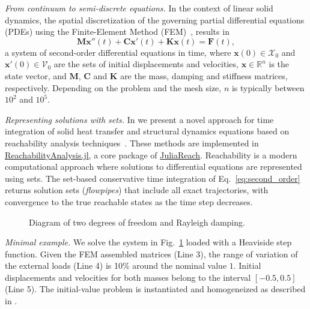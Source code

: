 \documentclass{juliacon}
\begin{document}
	


\maketitle

\emph{From continuum to semi-discrete equations.} In the context of linear solid dynamics, the spatial discretization of the governing partial differential equations (PDEs) using the Finite-Element Method (FEM)~\cite{Bathe2014}, results in
%
\begin{equation}\label{eq:second_order}
\mathbf{M} \mathbf{x}''(t) + \mathbf{C}\mathbf{x}'(t) + \mathbf{K}\mathbf{x}(t) = \mathbf{F}(t),
\end{equation}
%
a system of second-order differential equations in time, where $\mathbf{x}(0) \in \mathcal{X}_0$ and $\mathbf{x}'(0) \in \mathcal{V}_0$ are the sets of initial displacements and velocities, $\mathbf{x} \in \mathbb{R}^n$ is the state vector, and $\mathbf{M}$, $\mathbf{C}$ and $\mathbf{K}$ are the mass, damping and stiffness matrices, respectively. Depending on the problem and the mesh size, $n$ is typically  between $10^2$ and $10^5$.
	
\vspace{0.2cm}

\emph{Representing solutions with sets.} In \cite{forets2021combining} we present a novel approach for time integration of solid heat transfer and structural dynamics equations based on reachability analysis techniques~\cite{althoff2020set}. These methods are implemented in \href{http://github.com/JuliaReach/ReachabilityAnalysis.jl}{ReachabilityAnalysis.jl}, a core package of \href{http://juliareach.com}{JuliaReach}.
%
Reachability is a modern computational approach where solutions to differential equations are represented using sets.
%
The set-based conservative time integration of Eq.~\eqref{eq:second_order} returns solution sets (\emph{flowpipes}) that include all exact trajectories, with convergence to the true reachable states as the time step decreases.

\vspace{-0.1cm}

\begin{figure}[htb]
	\centering
 \def\svgwidth{0.25\textwidth}
 
 \caption{Diagram of two degrees of freedom and Rayleigh damping.}
 \label{fig:diagram}
\end{figure}

\noindent \emph{Minimal example.} We solve the system in Fig.~\ref{fig:diagram} loaded with a Heaviside step function.
%
Given the FEM assembled matrices (Line 3), the range of variation of the external loads (Line 4) is 10\% around the nominal value $1$.
%
Initial displacements and velocities for both masses belong to the interval $[-0.5, 0.5]$ (Line 5).
%
The initial-value problem is instantiated and homogeneized as described in \cite{forets2021combining}.
\end{document}

